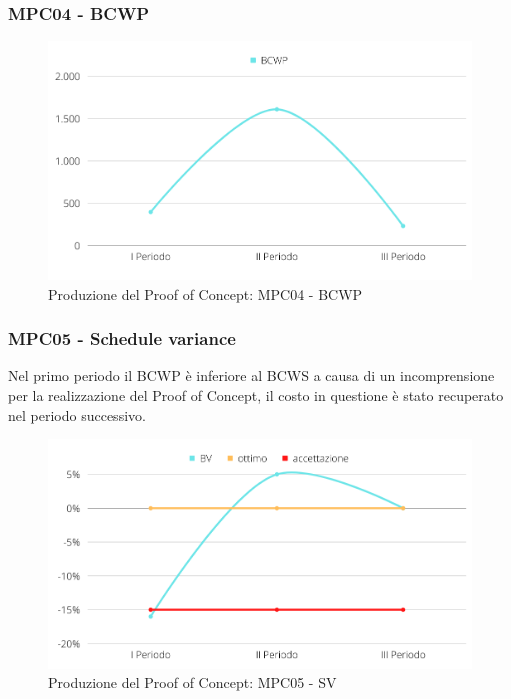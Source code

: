 \subsubsection{MPC04 - BCWP}
\begin{figure}[H]
    \centering
    \includegraphics[scale=0.50]{Sezioni/images/poc-BCWP.png}
    \caption{Produzione del Proof of Concept: MPC04 - BCWP}
\end{figure}

\subsubsection{MPC05 - Schedule variance}
Nel primo periodo il BCWP è inferiore al BCWS a causa di un incomprensione per la realizzazione del Proof of Concept, il costo in questione è stato recuperato nel periodo successivo.
\begin{figure}[H]
    \centering
    \includegraphics[scale=0.50]{Sezioni/images/poc-SV.png}
    \caption{Produzione del Proof of Concept: MPC05 - SV}
\end{figure}

